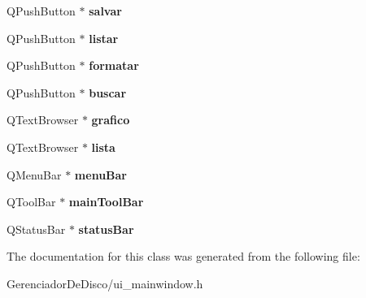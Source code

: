 \begin{DoxyCompactItemize}
\item 
\hypertarget{classUi__MainWindow_a24ed52a0e23d50390b91e9ab646ade6a}{}Q\+Push\+Button $\ast$ {\bfseries salvar}\label{classUi__MainWindow_a24ed52a0e23d50390b91e9ab646ade6a}

\item 
\hypertarget{classUi__MainWindow_a3cfcf36193deda6148cc897d603def3f}{}Q\+Push\+Button $\ast$ {\bfseries listar}\label{classUi__MainWindow_a3cfcf36193deda6148cc897d603def3f}

\item 
\hypertarget{classUi__MainWindow_a6fa54291a44a35e0ac5902da1b1b56c1}{}Q\+Push\+Button $\ast$ {\bfseries formatar}\label{classUi__MainWindow_a6fa54291a44a35e0ac5902da1b1b56c1}

\item 
\hypertarget{classUi__MainWindow_a854d97ac47fca80607e0065dafc6e173}{}Q\+Push\+Button $\ast$ {\bfseries buscar}\label{classUi__MainWindow_a854d97ac47fca80607e0065dafc6e173}

\item 
\hypertarget{classUi__MainWindow_a264cf5335b68aecd7f0ad2f9f1404e29}{}Q\+Text\+Browser $\ast$ {\bfseries grafico}\label{classUi__MainWindow_a264cf5335b68aecd7f0ad2f9f1404e29}

\item 
\hypertarget{classUi__MainWindow_affb80017316e30fd3befd35106fc2031}{}Q\+Text\+Browser $\ast$ {\bfseries lista}\label{classUi__MainWindow_affb80017316e30fd3befd35106fc2031}

\item 
\hypertarget{classUi__MainWindow_a2be1c24ec9adfca18e1dcc951931457f}{}Q\+Menu\+Bar $\ast$ {\bfseries menu\+Bar}\label{classUi__MainWindow_a2be1c24ec9adfca18e1dcc951931457f}

\item 
\hypertarget{classUi__MainWindow_a5172877001c8c7b4e0f6de50421867d1}{}Q\+Tool\+Bar $\ast$ {\bfseries main\+Tool\+Bar}\label{classUi__MainWindow_a5172877001c8c7b4e0f6de50421867d1}

\item 
\hypertarget{classUi__MainWindow_a50fa481337604bcc8bf68de18ab16ecd}{}Q\+Status\+Bar $\ast$ {\bfseries status\+Bar}\label{classUi__MainWindow_a50fa481337604bcc8bf68de18ab16ecd}

\end{DoxyCompactItemize}


The documentation for this class was generated from the following file\+:\begin{DoxyCompactItemize}
\item 
Gerenciador\+De\+Disco/ui\+\_\+mainwindow.\+h\end{DoxyCompactItemize}

